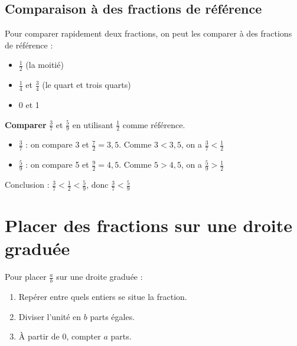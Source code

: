 \subsection{Comparaison à des fractions de référence}

\begin{methodebox}
	Pour comparer rapidement deux fractions, on peut les comparer à des fractions de référence :
	\begin{itemize}
		\item $\frac{1}{2}$ (la moitié)
		\item $\frac{1}{4}$ et $\frac{3}{4}$ (le quart et trois quarts)
		\item 0 et 1
	\end{itemize}
\end{methodebox}

\begin{examplebox}
	\textbf{Comparer} $\frac{3}{7}$ et $\frac{5}{9}$ en utilisant $\frac{1}{2}$ comme référence.
	
	\begin{itemize}
		\item $\frac{3}{7}$ : on compare 3 et $\frac{7}{2} = 3,5$. Comme $3 < 3,5$, on a $\frac{3}{7} < \frac{1}{2}$
		\item $\frac{5}{9}$ : on compare 5 et $\frac{9}{2} = 4,5$. Comme $5 > 4,5$, on a $\frac{5}{9} > \frac{1}{2}$
	\end{itemize}
	
	Conclusion : $\frac{3}{7} < \frac{1}{2} < \frac{5}{9}$, donc $\frac{3}{7} < \frac{5}{9}$
\end{examplebox}

\section{Placer des fractions sur une droite graduée}

\begin{methodebox}
	Pour placer $\frac{a}{b}$ sur une droite graduée :
	\begin{enumerate}
		\item Repérer entre quels entiers se situe la fraction.
		\item Diviser l'unité en $b$ parts égales.
		\item À partir de 0, compter $a$ parts.
	\end{enumerate}
\end{methodebox}

